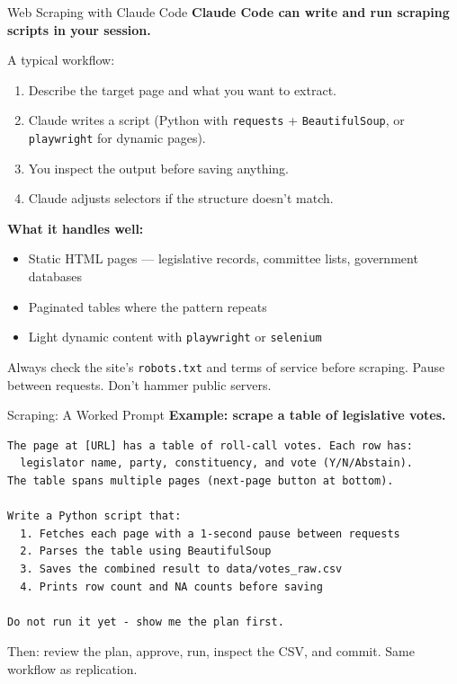 \documentclass[aspectratio=169, 11pt]{beamer}
\begin{document}

\begin{frame}{Web Scraping with Claude Code}
  \textbf{Claude Code can write and run scraping scripts in your session.}

  \vspace{0.5em}
  A typical workflow:
  \begin{enumerate}\small
    \item Describe the target page and what you want to extract.
    \item Claude writes a script (Python with \texttt{requests} + \texttt{BeautifulSoup}, or \texttt{playwright} for dynamic pages).
    \item You inspect the output before saving anything.
    \item Claude adjusts selectors if the structure doesn't match.
  \end{enumerate}

  \vspace{0.5em}
  \textbf{What it handles well:}
  \begin{itemize}\small
    \item Static HTML pages --- legislative records, committee lists, government databases
    \item Paginated tables where the pattern repeats
    \item Light dynamic content with \texttt{playwright} or \texttt{selenium}
  \end{itemize}

  \vspace{0.4em}
  \alert{\small Always check the site's \texttt{robots.txt} and terms of service before scraping. Pause between requests. Don't hammer public servers.}
\end{frame}

\begin{frame}[fragile]{Scraping: A Worked Prompt}
  \textbf{Example: scrape a table of legislative votes.}

  \vspace{0.4em}
  \begin{lstlisting}[basicstyle=\ttfamily\scriptsize]
The page at [URL] has a table of roll-call votes. Each row has:
  legislator name, party, constituency, and vote (Y/N/Abstain).
The table spans multiple pages (next-page button at bottom).

Write a Python script that:
  1. Fetches each page with a 1-second pause between requests
  2. Parses the table using BeautifulSoup
  3. Saves the combined result to data/votes_raw.csv
  4. Prints row count and NA counts before saving

Do not run it yet - show me the plan first.
  \end{lstlisting}

  \vspace{0.3em}
  {\small Then: review the plan, approve, run, inspect the CSV, and commit. Same workflow as replication.}
\end{frame}
\end{document}
